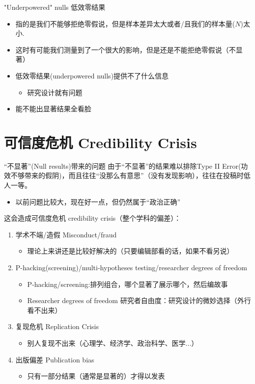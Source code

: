\documentclass{beamer}
\begin{document}
\begin{frame}{"Underpowered" nulls 低效零结果}
\begin{itemize}
    \item 指的是我们不能够拒绝零假说，但是样本差异太大或者/且我们的样本量($N$)太小.
    \item 这时有可能我们测量到了一个很大的影响，但是还是不能拒绝零假说（不显著）
    \item 低效零结果(underpowered nulls)提供不了什么信息
    \begin{itemize}
        \item 研究\alert{设计}就有问题
    \end{itemize}
    \item 能不能出显著结果全看脸
\end{itemize}
\end{frame}

\section{可信度危机 Credibility Crisis}
\begin{frame}{“不显著”(Null results)带来的问题}
由于“不显著”的结果难以排除Type II Error(功效不够带来的假阴)，而且往往“没那么有意思”（没有发现影响），往往在投稿时低人一等。
\begin{itemize}
    \item 以前问题比较大，现在好一点，但仍然属于“政治正确”
\end{itemize}
这会造成\alert{可信度危机 credibility crisis}（整个学科的偏差）：
\begin{enumerate}
    \item <2->学术不端/造假 Misconduct/fraud
    \begin{itemize}
        \item 理论上来讲还是比较好解决的（只要编辑部看的话，如果不看另说）
    \end{itemize}
    \item <3->P-hacking(screening)/multi-hypotheses testing/researcher degrees of freedom
    \begin{itemize}
        \item P-hacking/screening:排列组合，哪个显著了展示哪个，然后编故事
        \item Researcher degrees of freedom 研究者自由度：研究设计的微妙选择（外行看不出来）
    \end{itemize}
    \item <4->复现危机 Replication Crisis
    \begin{itemize}
        \item 别人复现不出来（心理学、经济学、政治科学、医学...）
    \end{itemize}
    \item <5->出版偏差 Publication bias
    \begin{itemize}
        \item 只有一部分结果（通常是显著的）才得以发表
    \end{itemize}
\end{enumerate}
\end{frame}
\end{document}

